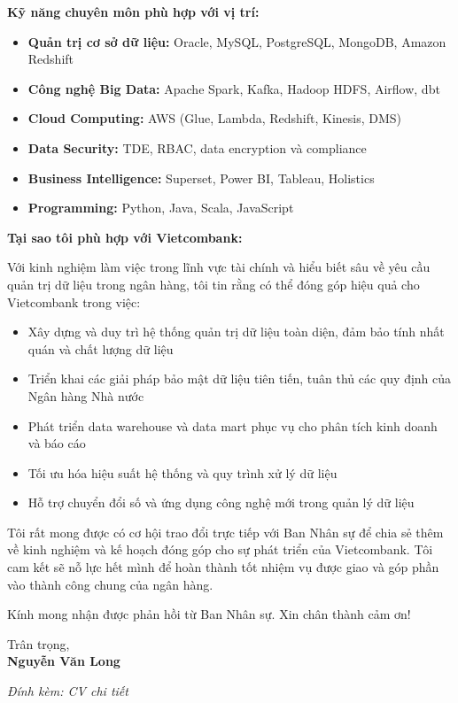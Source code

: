 \documentclass[11pt, letterpaper]{article}
\begin{document}
\textbf{Kỹ năng chuyên môn phù hợp với vị trí:}

\begin{itemize}[leftmargin=1.5cm]
    \item \textbf{Quản trị cơ sở dữ liệu:} Oracle, MySQL, PostgreSQL, MongoDB, Amazon Redshift
    \item \textbf{Công nghệ Big Data:} Apache Spark, Kafka, Hadoop HDFS, Airflow, dbt
    \item \textbf{Cloud Computing:} AWS (Glue, Lambda, Redshift, Kinesis, DMS)
    \item \textbf{Data Security:} TDE, RBAC, data encryption và compliance
    \item \textbf{Business Intelligence:} Superset, Power BI, Tableau, Holistics
    \item \textbf{Programming:} Python, Java, Scala, JavaScript
\end{itemize}

\textbf{Tại sao tôi phù hợp với Vietcombank:}

Với kinh nghiệm làm việc trong lĩnh vực tài chính và hiểu biết sâu về yêu cầu quản trị dữ liệu trong ngân hàng, tôi tin rằng có thể đóng góp hiệu quả cho Vietcombank trong việc:

\begin{itemize}[leftmargin=1.5cm]
    \item Xây dựng và duy trì hệ thống quản trị dữ liệu toàn diện, đảm bảo tính nhất quán và chất lượng dữ liệu
    \item Triển khai các giải pháp bảo mật dữ liệu tiên tiến, tuân thủ các quy định của Ngân hàng Nhà nước
    \item Phát triển data warehouse và data mart phục vụ cho phân tích kinh doanh và báo cáo
    \item Tối ưu hóa hiệu suất hệ thống và quy trình xử lý dữ liệu
    \item Hỗ trợ chuyển đổi số và ứng dụng công nghệ mới trong quản lý dữ liệu
\end{itemize}

Tôi rất mong được có cơ hội trao đổi trực tiếp với Ban Nhân sự để chia sẻ thêm về kinh nghiệm và kế hoạch đóng góp cho sự phát triển của Vietcombank. Tôi cam kết sẽ nỗ lực hết mình để hoàn thành tốt nhiệm vụ được giao và góp phần vào thành công chung của ngân hàng.

Kính mong nhận được phản hồi từ Ban Nhân sự. Xin chân thành cảm ơn!

\vspace{1cm}

\begin{flushright}
Trân trọng,\\
\vspace{0.5cm}
\textbf{Nguyễn Văn Long}
\end{flushright}

\vspace{1cm}

\textit{Đính kèm: CV chi tiết}
\end{document}
